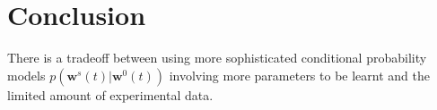 \documentclass{bioinfo}
\begin{document}
 
\section{Conclusion}
\label{sec:conclusions}

There is a tradeoff between using more sophisticated conditional
probability models $p(\mathbf{w}^{s}(t) |\mathbf{w}^{0}(t))$ involving more
parameters to be learnt and the limited amount of experimental
data. 




\appendix
\end{document}
